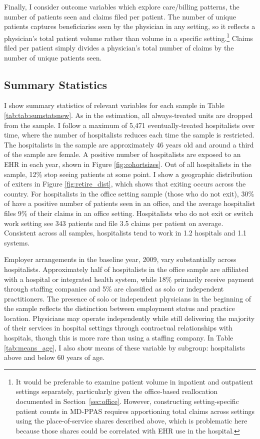 \documentclass[12pt]{article}
\begin{document}
Finally, I consider outcome variables which explore care/billing patterns, the number of patients seen and claims filed per patient. The number of unique patients captures beneficiaries seen by the physician in any setting, so it reflects a physician's total patient volume rather than volume in a specific setting.\footnote{It would be preferable to examine patient volume in inpatient and outpatient settings separately, particularly given the office-based reallocation documented in Section~\ref{sec:office}. However, constructing setting-specific patient counts in MD-PPAS requires apportioning total claims across settings using the place-of-service
shares described above, which is problematic here because those shares could be correlated with EHR use in the hospital.} Claims filed per patient simply divides a physician's total number of claims by the number of unique patients seen.


\subsection{Summary Statistics}\label{sec:sumstats}

I show summary statistics of relevant variables for each sample in Table \ref{tab:tab:sumstatsnew}. As in the estimation, all always-treated units are dropped from the sample. I follow a maximum of 5,471 eventually-treated hospitalists over time, where the number of hospitalists reduces each time the sample is restricted. The hospitalists in the sample are approximately 46 years old and around a third of the sample are female. A positive number of hospitalists are exposed to an EHR in each year, shown in Figure \ref{fig:cohortsizes}. Out of all hospitalists in the sample, 12\% stop seeing patients at some point. I show a geographic distribution of exiters in Figure \ref{fig:retire_dist}, which shows that exiting occurs across the country. For hospitalists in the office setting sample (those who do not exit), 30\% of have a positive number of patients seen in an office, and the average hospitalist files 9\% of their claims in an office setting. Hospitalists who do not exit or switch work setting see 343 patients and file 3.5 claims per patient on average. Consistent across all samples, hospitalists tend to work in 1.2 hospitals and 1.1 systems. 

Employer arrangements in the baseline year, 2009, vary substantially across hospitalists. Approximately half of hospitalists in the office sample are affiliated with a hospital or integrated health system, while 18\% primarily receive payment through staffing companies and 5\% are classified as solo or independent practitioners. The presence of solo or independent physicians in the beginning of the sample reflects the distinction between employment status and practice location. Physicians may operate independently while still delivering the majority of their services in hospital settings through contractual relationships with hospitals, though this is more rare than using a staffing company. In Table \ref{tab:means_age}, I also show means of these variable by subgroup: hospitalists above and below 60 years of age. 
\end{document}
